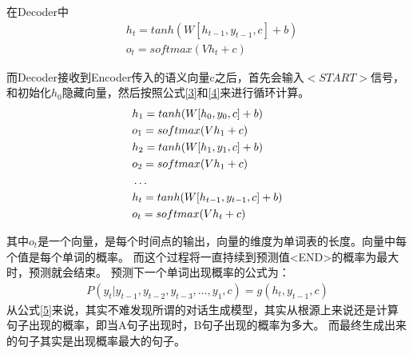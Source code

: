 \documentclass[supercite]{HustGraduPaper}
\theoremstyle{definition}
\begin{document}
在Decoder中
\begin{align}
  &h_t = tanh(W[h_{t-1},y_{t-1},c] + b) \label{3}\\
  &o_t = softmax(Vh_t + c) \label{4}
\end{align}

而Decoder接收到Encoder传入的语义向量c之后，首先会输入$<START>$信号，和初始化$h_0$隐藏向量，然后按照公式\ref{3}和\ref{4}来进行循环计算。
\begin{align}
  &h_1 = tanh(W[h_0,y_0,c] + b)\notag\\
  &o_1 = softmax(Vh_1 + c)\notag\\
  &h_2 = tanh(W[h_1,y_1,c] + b)\notag\\
  &o_2 = softmax(Vh_1 + c)\notag\\
  &\dots\notag\\
  &h_t = tanh(W[h_{t-1},y_{t-1},c] + b)\notag\\
  &o_t = softmax(Vh_t + c)\notag
\end{align}

其中$o_t$是一个向量，是每个时间点的输出，向量的维度为单词表的长度。向量中每个值是每个单词的概率。
而这个过程将一直持续到预测值<END>的概率为最大时，预测就会结束。
预测下一个单词出现概率的公式为：
\begin{align}
  P(y_{t}|y_{t-1},y_{t-2},y_{t-3},\dots,y_{1},c) = g(h_{t},y_{t-1},c) \label{5}
\end{align}
从公式\ref{5}来说，其实不难发现所谓的对话生成模型，其实从根源上来说还是计算句子出现的概率，即当A句子出现时，B句子出现的概率为多大。
而最终生成出来的句子其实是出现概率最大的句子。
\end{document}
